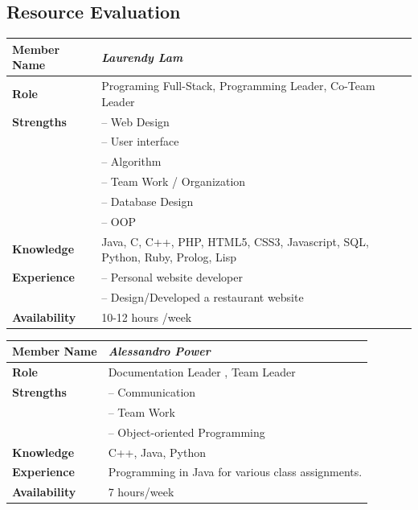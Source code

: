 \documentclass[12pt]{article}
\begin{document}
\subsection{Resource Evaluation}
\begin{center}
\begin{tabular}{ p{2.7cm} | p{9cm} }
\hline
\textbf{Member Name}	&	\textit{\textbf{Laurendy Lam}}	\\ \hline \hline
\textbf{Role}		&	Programing Full-Stack, Programming Leader, Co-Team Leader	\\ \hline
\textbf{Strengths}	&	-- Web Design	\\
			&	-- User interface	\\
			&	-- Algorithm	\\
			&	-- Team Work / Organization	\\
			&	-- Database Design	\\
			&	-- OOP	\\ \hline
\textbf{Knowledge}	&	Java, C, C++, PHP, HTML5, CSS3, Javascript, SQL, Python, Ruby, Prolog, Lisp	\\ \hline
\textbf{Experience}	&	-- Personal website developer	\\
			&	-- Design/Developed a restaurant website 	\\ \hline
\textbf{Availability}	&	10-12 hours /week	\\ \hline
\end{tabular}
\end{center}
%
\vspace{3mm}
%
\begin{center}
\begin{tabular}{ p{2.7cm} | p{9cm} }
\hline
\textbf{Member Name}	&	\textit{\textbf{Alessandro Power}}	\\ \hline \hline
\textbf{Role}		&	Documentation Leader , Team Leader	\\ \hline
\textbf{Strengths}	&	-- Communication	\\
			&	-- Team Work	\\
			&	-- Object-oriented Programming	\\ \hline
\textbf{Knowledge}	&	C++, Java, Python	\\ \hline
\textbf{Experience}	&	Programming in Java for various class assignments.	\\ \hline
\textbf{Availability}	&	7 hours/week	\\ \hline
\end{tabular}
\end{center}
%
\vspace{3mm}
\end{document}
